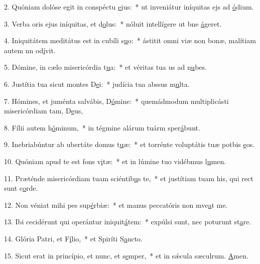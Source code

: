 2. Quóniam dolóse egit in conspéctu \uline{e}jus:~* ut inveniátur iníquitas ejs ad \uline{ó}dium.\par 
3. Verba oris ejus iníquitas, et d\uline{o}lus:~* nóluit intellígere ut bne \uline{á}geret.\par 
4. Iniquitátem meditátus est in cubíli s\uline{u}o:~* ástitit omni viæ non bonæ, malítiam autem nn od\uline{í}vit.\par 
5. Dómine, in cælo misericórdia t\uline{u}a:~* et véritas tua us ad n\uline{u}bes.\par 
6. Justítia tua sicut montes D\uline{e}i:~* judícia tua abssus m\uline{u}lta.\par 
7. Hómines, et juménta salvábis, D\uline{ó}mine:~* quemádmodum multiplicásti misericórdiam tam, D\uline{e}us,\par 
8. Fílii autem h\uline{ó}minum,~* in tégmine alárum tuárm sper\uline{á}bunt.\par 
9. Inebriabúntur ab ubertáte domus t\uline{u}æ:~* et torrénte voluptátis tuæ potbis \uline{e}os.\par 
10. Quóniam apud te est fons v\uline{i}tæ:~* et in lúmine tuo vidébmus l\uline{u}men.\par 
11. Præténde misericórdiam tuam sciéntib\uline{u}s te,~* et justítiam tuam his, qui rect sunt c\uline{o}rde.\par 
12. Non véniat mihi pes sup\uline{é}rbiæ:~* et manus peccatóris non mve\uline{a}t me.\par 
13. Ibi cecidérunt qui operántur iniquit\uline{á}tem:~* expúlsi sunt, nec poturunt st\uline{a}re.\par 
14. Glória Patri, et F\uline{í}lio,~* et Spiríti S\uline{a}ncto.\par 
15. Sicut erat in princípio, et nunc, et s\uline{e}mper,~* et in sǽcula sæculrum. \uline{A}men.\par 

